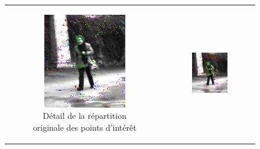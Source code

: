 \begin{figure}[h]
{\begin{tabular} {c c}
			\\	
			\begin{subfigure}{0.28\textwidth}
				\includegraphics[width=\textwidth]{Chapter5/graphics/ex_adaptive_sampling_3_zoom.png} 
				\caption{Détail de la répartition originale des points d'intérêt}
			\end{subfigure}	
			&
			\begin{subfigure}{0.28\textwidth}
				\includegraphics[width=\textwidth]{Chapter5/graphics/ex_adaptive_sampling_2_crop_zoom.png} 

\end{subfigure}
\end{tabular}}
\end{figure}
